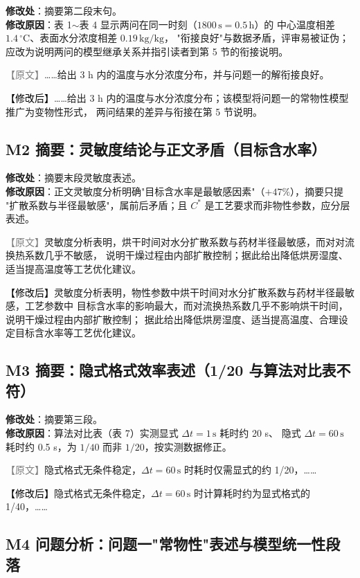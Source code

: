 \documentclass[UTF8,zihao=-4]{ctexart}
\newcommand{\yuanduan}[1]{\par\noindent\textcolor{gray}{\small 【原文】}#1\par}
\newcommand{\xinduan}[1]{\par\noindent\textcolor{black}{\small 【修改后】}#1\par}
\begin{document}
\textbf{修改处}：摘要第二段末句。\\
\textbf{修改原因}：表 1$\sim$表 4 显示两问在同一时刻（$1800\,\mathrm{s}=0.5\,\mathrm{h}$）的
中心温度相差 $1.4\,{}^\circ$C、表面水分浓度相差 $0.19\,\mathrm{kg/kg}$，
"衔接良好"与数据矛盾，评审易被证伪；应改为说明两问的模型继承关系并指引读者到第 5 节的衔接说明。

\yuanduan{……给出 3 h 内的温度与水分浓度分布，并与问题一的解衔接良好。}
\xinduan{……给出 3 h 内的温度与水分浓度分布；该模型将问题一的常物性模型推广为变物性形式，
两问结果的差异与衔接在第 5 节说明。}

\subsection*{M2 摘要：灵敏度结论与正文矛盾（目标含水率）}

\textbf{修改处}：摘要末段灵敏度表述。\\
\textbf{修改原因}：正文灵敏度分析明确"目标含水率是最敏感因素"（$+47\%$），摘要只提
"扩散系数与半径最敏感"，属前后矛盾；且 $C^{*}$ 是工艺要求而非物性参数，应分层表述。

\yuanduan{灵敏度分析表明，烘干时间对水分扩散系数与药材半径最敏感，而对对流换热系数几乎不敏感，
说明干燥过程由内部扩散控制；据此给出降低烘房湿度、适当提高温度等工艺优化建议。}
\xinduan{灵敏度分析表明，物性参数中烘干时间对水分扩散系数与药材半径最敏感，工艺参数中
目标含水率的影响最大，而对流换热系数几乎不影响烘干时间，说明干燥过程由内部扩散控制；
据此给出降低烘房湿度、适当提高温度、合理设定目标含水率等工艺优化建议。}

\subsection*{M3 摘要：隐式格式效率表述（1/20 与算法对比表不符）}

\textbf{修改处}：摘要第三段。\\
\textbf{修改原因}：算法对比表（表 7）实测显式 $\Delta t=1\,\mathrm{s}$ 耗时约 20 s、
隐式 $\Delta t=60\,\mathrm{s}$ 耗时约 0.5 s，为 $1/40$ 而非 $1/20$，按实测数据修正。

\yuanduan{隐式格式无条件稳定，$\Delta t=60\,\mathrm{s}$ 时耗时仅需显式的约 1/20，……}
\xinduan{隐式格式无条件稳定，$\Delta t=60\,\mathrm{s}$ 时计算耗时约为显式格式的 1/40，……}

\subsection*{M4 问题分析：问题一"常物性"表述与模型统一性段落}
\end{document}
